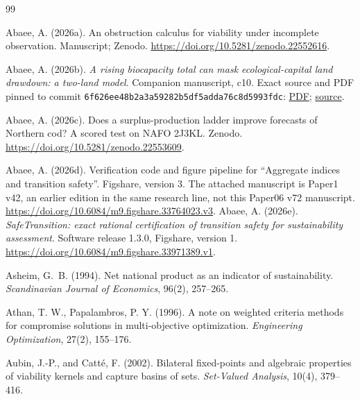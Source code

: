 \documentclass[preprint,11pt,authoryear]{elsarticle}
\theoremstyle{definition}
\theoremstyle{remark}
\begin{document}
\begin{thebibliography}{99}
\makeatletter\renewcommand{\@biblabel}[1]{}\makeatother

 Abaee, A. (2026a). An obstruction calculus for viability under incomplete observation. Manuscript; Zenodo. \url{https://doi.org/10.5281/zenodo.22552616}.

 Abaee, A. (2026b). \emph{A rising biocapacity total can mask ecological-capital land drawdown: a two-land model}. Companion manuscript, c10. Exact source and PDF pinned to commit \texttt{6f626ee48b2a3a59282b5df5adda76c8d5993fdc}: \href{https://github.com/MIKEAA2020/general-sustainability/blob/6f626ee48b2a3a59282b5df5adda76c8d5993fdc/agent%202%20productivity%20illusion/output_v45_ecomod_continued_10_gemini38_v4base_si_review_20261026/ecomod_continued_10.pdf}{PDF}; \href{https://github.com/MIKEAA2020/general-sustainability/blob/6f626ee48b2a3a59282b5df5adda76c8d5993fdc/agent%202%20productivity%20illusion/output_v45_ecomod_continued_10_gemini38_v4base_si_review_20261026/ecomod_continued_10.tex}{source}.

 Abaee, A. (2026c). Does a surplus-production ladder improve forecasts of Northern cod? A scored test on NAFO 2J3KL. Zenodo. \url{https://doi.org/10.5281/zenodo.22553609}.

 Abaee, A. (2026d). Verification code and figure pipeline for ``Aggregate indices and transition safety''. Figshare, version 3. The attached manuscript is Paper1 v42, an earlier edition in the same research line, not this Paper06 v72 manuscript. \url{https://doi.org/10.6084/m9.figshare.33764023.v3}.
 Abaee, A. (2026e). \emph{SafeTransition: exact rational certification of transition safety for sustainability assessment}. Software release 1.3.0, Figshare, version 1. \url{https://doi.org/10.6084/m9.figshare.33971389.v1}.

 Asheim, G.~B. (1994). Net national product as an indicator of sustainability. \emph{Scandinavian Journal of Economics}, 96(2), 257--265.

 Athan, T. W., Papalambros, P. Y. (1996). A note on weighted criteria methods for compromise solutions in multi-objective optimization. \emph{Engineering Optimization}, 27(2), 155--176.

 Aubin, J.-P., and Catt\'e, F. (2002). Bilateral fixed-points and algebraic properties of viability kernels and capture basins of sets. \emph{Set-Valued Analysis}, 10(4), 379--416.


\end{thebibliography}
\end{document}
